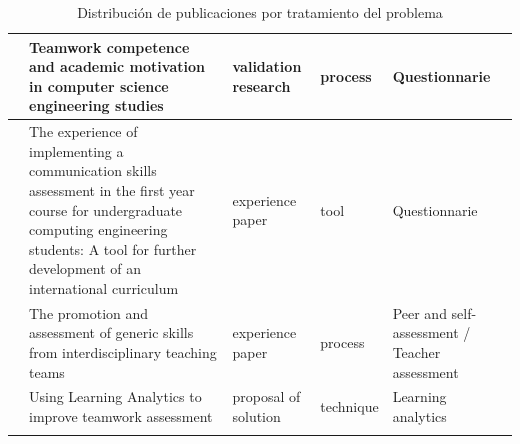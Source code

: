 \begin{landscape}
\begin{center}
\begin{longtable}{| m{2.5cm} | m{9cm} | m{4cm} | m{2.5cm} | m{3.5cm} |}
    \hline
    \cite{martinez2014teamwork} & Teamwork competence and academic motivation in computer science engineering studies & validation research & process & Questionnarie \\
    \hline
    \cite{fernandez2011experience} & The experience of implementing a communication skills assessment in the first year course for undergraduate computing engineering students: A tool for further development of an international curriculum & experience paper & tool & Questionnarie \\
    \hline
    \cite{carreras2013promotion} & The promotion and assessment of generic skills from interdisciplinary teaching teams & experience paper & process & Peer and self-assessment / Teacher assessment \\
    \hline
    \cite{fidalgo:2015} & Using Learning Analytics to improve teamwork assessment & proposal of solution & technique & Learning analytics \\
    \hline
\caption{Distribución de publicaciones por tratamiento del problema}
\label{tab:ListadoTrabajos}
\end{longtable}
\end{center}
\end{landscape}

\pagestyle{fancy}



